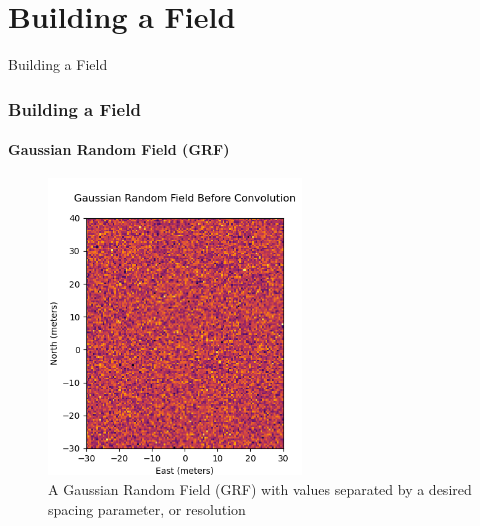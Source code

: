 \documentclass[professionalfont,10pt]{beamer}
\begin{document}
	\section{Building a Field}
	\begin{frame}[t]{Building a Field}
		\frametitle{Building a Field}
		\framesubtitle{Gaussian Random Field (GRF)}
		\hskip-0.75cm
		\begin{minipage}[t]{0.2\linewidth}\vspace{-0.5cm}
			\tiny\tableofcontents[currentsection,currentsubsection,hideothersubsections,subsectionstyle=show/shaded]
		\end{minipage}
		\hfill%
		\begin{minipage}[t]{0.86\linewidth}\vspace{-0.5cm}
			\begin{figure}[t]
				\centering
				\captionsetup{width=0.9\textwidth}
				\includegraphics[width=0.6\textwidth]{../images/GRFbeforeConv.png}
				\caption{A Gaussian Random Field (GRF) with values separated by a desired spacing parameter, or resolution}
				\label{CFandEncoder}
			\end{figure}
		\end{minipage}
		\vfill%
	\end{frame}
\end{document}
